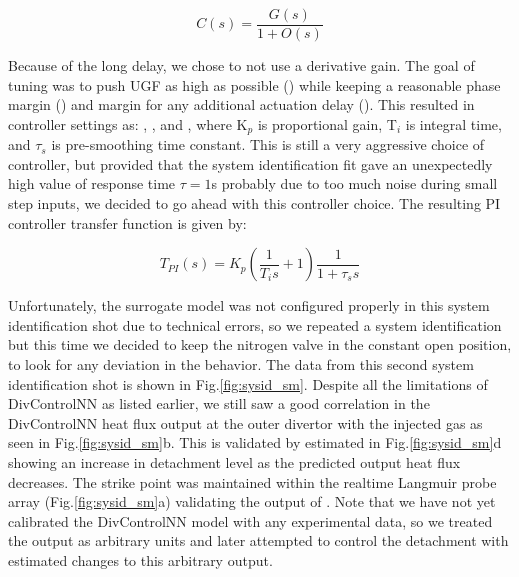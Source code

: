 \begin{equation}
 C(s) = \frac{G(s)}{1 + O(s)}
\label{eq:cltf}
\end{equation}



Because of the long delay, we chose to not use a derivative gain.
The goal of tuning was to push \ac{UGF} as high as possible (\AfracUGF) while keeping a reasonable phase margin (\AfracPhaseMargin) and margin for any additional actuation delay (\AfracDelayMargin).
This resulted in controller settings as: \AfracKp, \AfracTi, and \Afracstau, where K$_p$ is proportional gain, T$_i$ is integral time, and $\tau_s$ is pre-smoothing time constant.
This is still a very aggressive choice of controller, but provided that the system identification fit gave an unexpectedly high value of response time $\tau=1$s probably due to too much noise during small step inputs, we decided to go ahead with this controller choice.
The resulting PI controller transfer function is given by:

\begin{equation}
 T_{PI}(s) = K_p \left( \frac{1}{T_i s} + 1\right) \frac{1}{1 + \tau_s s}
\label{eq:PI}
\end{equation}

Unfortunately, the surrogate model was not configured properly in this system identification shot due to technical errors, so we repeated a system identification but this time we decided to keep the nitrogen valve in the constant open position, to look for any deviation in the behavior.
The data from this second system identification shot is shown in Fig.\ref{fig:sysid_sm}.
Despite all the limitations of DivControlNN as listed earlier, we still saw a good correlation in the DivControlNN heat flux output at the outer divertor with the injected gas as seen in Fig.\ref{fig:sysid_sm}b.
This is validated by estimated \Afrac in Fig.\ref{fig:sysid_sm}d showing an increase in detachment level as the predicted output heat flux decreases.
The strike point was maintained within the realtime Langmuir probe array (Fig.\ref{fig:sysid_sm}a) validating the output of \Afrac.
Note that we have not yet calibrated the DivControlNN model with any experimental data, so we treated the output as arbitrary units and later attempted to control the detachment with estimated changes to this arbitrary output.

